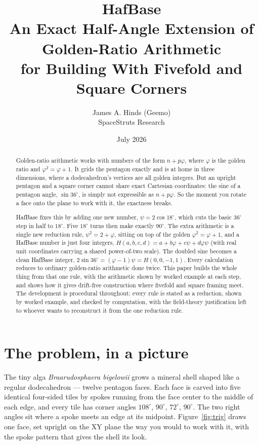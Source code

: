 \documentclass[11pt]{article}
\title{\textbf{HafBase}\\[4pt]
\large An Exact Half-Angle Extension of Golden-Ratio Arithmetic\\
\large for Building With Fivefold and Square Corners}
\author{James A. Hinds (Geemo)\\ SpaceStruts Research}
\date{July 2026}
\newcommand{\phigr}{\varphi}
\newcommand{\Hn}[4]{H(#1,#2,#3,#4)}
\begin{document}
\maketitle

\begin{abstract}
Golden-ratio arithmetic works with numbers of the form $n + p\phigr$, where $\phigr$ is the
golden ratio and $\phigr^2 = \phigr + 1$. It grids the pentagon exactly and is at home in three
dimensions, where a dodecahedron's vertices are all golden integers. But an upright pentagon and
a square corner cannot share exact Cartesian coordinates: the sine of a pentagon angle,
$\sin 36^\circ$, is simply not expressible as $n + p\phigr$. So the moment you rotate a face onto the
plane to work with it, the exactness breaks.

HafBase fixes this by adding one new number, $\psi = 2\cos 18^\circ$, which cuts the basic
$36^\circ$ step in half to $18^\circ$. Five $18^\circ$ turns then make exactly $90^\circ$.
The extra arithmetic is a single new reduction rule, $\psi^2 = 2 + \phigr$, sitting on top of the golden
$\phigr^2 = \phigr + 1$, and a HafBase number is just four integers,
$\Hn{a}{b}{c}{d} = a + b\phigr + c\psi + d\phigr\psi$ (with real unit coordinates carrying a shared
power-of-two scale). The doubled sine becomes a clean HafBase integer, $2\sin 36^\circ = (\phigr-1)\psi
= \Hn{0}{0}{-1}{1}$. Every calculation reduces
to ordinary golden-ratio arithmetic done twice. This paper builds the whole thing from that one
rule, with the arithmetic shown by worked example at each step, and shows how it gives drift-free
construction where fivefold and square framing meet. The development is procedural throughout: every
rule is stated as a reduction, shown by worked example, and checked by computation, with the field-theory
justification left to whoever wants to reconstruct it from the one reduction rule.
\end{abstract}

\section{The problem, in a picture}

The tiny alga \emph{Braarudosphaera bigelowii} grows a mineral shell shaped like a regular
dodecahedron --- twelve pentagon faces. Each face is carved into five identical four-sided tiles by
spokes running from the face center to the middle of each edge, and every tile has corner angles
$108^\circ$, $90^\circ$, $72^\circ$, $90^\circ$. The two right angles sit where a spoke meets an edge
at its midpoint. Figure~\ref{fig:trig} draws one face, set upright on the XY plane the way you would to
work with it, with the spoke pattern that gives the shell its look.
\end{document}
